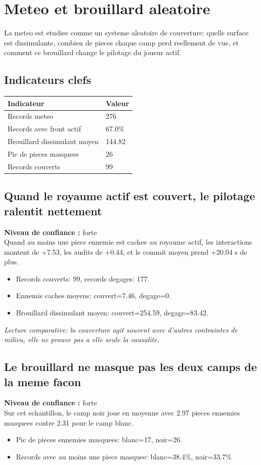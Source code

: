 \documentclass[11pt,a4paper]{article}
\begin{document}
\section{Meteo et brouillard aleatoire}
La meteo est etudiee comme un systeme aleatoire de couverture: quelle surface est dissimulante, combien de pieces chaque camp perd reellement de vue, et comment ce brouillard change le pilotage du joueur actif.
\subsection*{Indicateurs clefs}
\begin{tabularx}{\linewidth}{lX}
\toprule
Indicateur & Valeur \\
\midrule
Records meteo & 276 \\
Records avec front actif & 67.0\% \\
Brouillard dissimulant moyen & 144.82 \\
Pic de pieces masquees & 26 \\
Records couverts & 99 \\
\bottomrule
\end{tabularx}
\subsection*{Quand le royaume actif est couvert, le pilotage ralentit nettement}
\textbf{Niveau de confiance :} forte\\
Quand au moins une piece ennemie est cachee au royaume actif, les interactions montent de +7.53, les audits de +0.44, et le commit moyen prend +20.04 s de plus.
\begin{itemize}
\item Records couverts: 99, records degages: 177.
\item Ennemis caches moyens: couvert=7.46, degage=0.
\item Brouillard dissimulant moyen: couvert=254.59, degage=83.42.
\end{itemize}
\textit{Lecture comparative: la couverture agit souvent avec d'autres contraintes de milieu, elle ne prouve pas a elle seule la causalite.}
\subsection*{Le brouillard ne masque pas les deux camps de la meme facon}
\textbf{Niveau de confiance :} forte\\
Sur cet echantillon, le camp noir joue en moyenne avec 2.97 pieces ennemies masquees contre 2.31 pour le camp blanc.
\begin{itemize}
\item Pic de pieces ennemies masquees: blanc=17, noir=26.
\item Records avec au moins une piece masquee: blanc=38.4\%, noir=33.7\%
\end{itemize}
\end{document}
